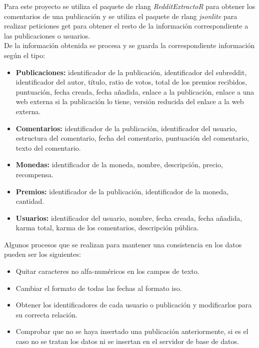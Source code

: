 \documentclass[../../main.tex]{subfiles}
\begin{document}
\vskip 0.2in

Para este proyecto se utiliza el paquete de \gls{rlang} \textit{RedditExtractoR} para obtener los comentarios de una publicación y se utiliza el paquete de \gls{rlang} \textit{jsonlite} para realizar peticiones \gls{get} para obtener el resto de la información correspondiente a las publicaciones o usuarios. \\

De la información obtenida se procesa y se guarda la correspondiente información según el tipo:

\begin{itemize}
    \item \textbf{Publicaciones:} identificador de la publicación, identificador del \gls{subreddit}, identificador del autor, título, ratio de votos, total de los premios recibidos, puntuación, fecha creada, fecha añadida, enlace a la publicación, enlace a una web externa si la publicación lo tiene, versión reducida del enlace a la web externa.

    \item \textbf{Comentarios:} identificador de la publicación, identificador del usuario, estructura del comentario, fecha del comentario, puntuación del comentario, texto del comentario.

    \item \textbf{Monedas:} identificador de la moneda, nombre, descripción, precio, recompensa.

    \item \textbf{Premios:} identificador de la publicación, identificador de la moneda, cantidad.
    
    \item \textbf{Usuarios:} identificador del usuario, nombre, fecha creada, fecha añadida, karma total, karma de los comentarios, descripción pública.
\end{itemize}

Algunos procesos que se realizan para mantener una consistencia en los datos pueden ser los siguientes: 
\begin{itemize}
    \item Quitar caracteres no alfa-numéricos en los campos de texto.
    \item Cambiar el formato de todas las fechas al formato \gls{iso}.
    \item Obtener los identificadores de cada usuario o publicación y modificarlos para su correcta relación.
    \item Comprobar que no se haya insertado una publicación anteriormente, si es el caso no se tratan los datos ni se insertan en el servidor de base de datos.
\end{itemize}
\end{document}
